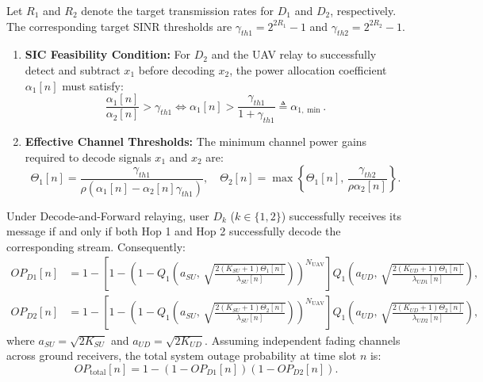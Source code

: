 \begin{proposition}
Let $R_1$ and $R_2$ denote the target transmission rates for $D_1$ and $D_2$, respectively. The corresponding target SINR thresholds are $\gamma_{th1} = 2^{2R_1} - 1$ and $\gamma_{th2} = 2^{2R_2} - 1$.
\begin{enumerate}
    \item \textbf{SIC Feasibility Condition:} For $D_2$ and the UAV relay to successfully detect and subtract $x_1$ before decoding $x_2$, the power allocation coefficient $\alpha_1[n]$ must satisfy:
    \begin{equation}
        \frac{\alpha_1[n]}{\alpha_2[n]} > \gamma_{th1} \iff \alpha_1[n] > \frac{\gamma_{th1}}{1 + \gamma_{th1}} \triangleq \alpha_{1,\min}.
        \label{eq:sic_condition}
    \end{equation}
    \item \textbf{Effective Channel Thresholds:} The minimum channel power gains required to decode signals $x_1$ and $x_2$ are:
    \begin{equation}
        \Theta_1[n] = \frac{\gamma_{th1}}{\rho \left( \alpha_1[n] - \alpha_2[n] \gamma_{th1} \right)}, \quad \Theta_2[n] = \max\left\{ \Theta_1[n], \, \frac{\gamma_{th2}}{\rho \alpha_2[n]} \right\}.
        \label{eq:thresholds}
    \end{equation}
\end{enumerate}
\end{proposition}

\begin{theorem}
Under Decode-and-Forward relaying, user $D_k$ ($k \in \{1, 2\}$) successfully receives its message if and only if both Hop 1 and Hop 2 successfully decode the corresponding stream. Consequently:
\begin{align}
    OP_{D1}[n] &= 1 - \left[ 1 - \left( 1 - Q_1\left( a_{SU}, \, \sqrt{\frac{2(K_{SU}+1)\Theta_1[n]}{\lambda_{SU}[n]}} \right) \right)^{N_{\text{UAV}}} \right] Q_1\left( a_{UD}, \, \sqrt{\frac{2(K_{UD}+1)\Theta_1[n]}{\lambda_{UD1}[n]}} \right), \label{eq:op_d1} \\
    OP_{D2}[n] &= 1 - \left[ 1 - \left( 1 - Q_1\left( a_{SU}, \, \sqrt{\frac{2(K_{SU}+1)\Theta_2[n]}{\lambda_{SU}[n]}} \right) \right)^{N_{\text{UAV}}} \right] Q_1\left( a_{UD}, \, \sqrt{\frac{2(K_{UD}+1)\Theta_2[n]}{\lambda_{UD2}[n]}} \right), \label{eq:op_d2}
\end{align}
where $a_{SU} = \sqrt{2K_{SU}}$ and $a_{UD} = \sqrt{2K_{UD}}$. Assuming independent fading channels across ground receivers, the total system outage probability at time slot $n$ is:
\begin{equation}
    OP_{\text{total}}[n] = 1 - \left( 1 - OP_{D1}[n] \right) \left( 1 - OP_{D2}[n] \right).
    \label{eq:op_total}
\end{equation}
\end{theorem}

